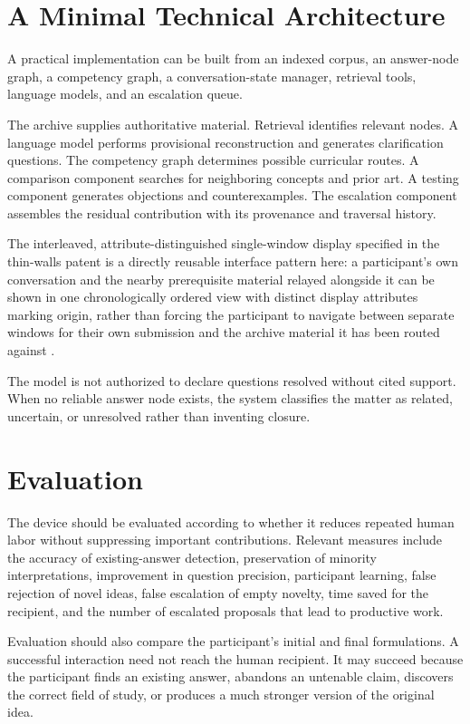 \documentclass[11pt]{article}
\begin{document}
\section{A Minimal Technical Architecture}

A practical implementation can be built from an indexed corpus, an answer-node graph, a competency graph, a conversation-state manager, retrieval tools, language models, and an escalation queue.

The archive supplies authoritative material. Retrieval identifies relevant nodes. A language model performs provisional reconstruction and generates clarification questions. The competency graph determines possible curricular routes. A comparison component searches for neighboring concepts and prior art. A testing component generates objections and counterexamples. The escalation component assembles the residual contribution with its provenance and traversal history.

The interleaved, attribute-distinguished single-window display specified in the thin-walls patent is a directly reusable interface pattern here: a participant's own conversation and the nearby prerequisite material relayed alongside it can be shown in one chronologically ordered view with distinct display attributes marking origin, rather than forcing the participant to navigate between separate windows for their own submission and the archive material it has been routed against \cite{anderson2011thinwalls}.

The model is not authorized to declare questions resolved without cited support. When no reliable answer node exists, the system classifies the matter as related, uncertain, or unresolved rather than inventing closure.

\section{Evaluation}

The device should be evaluated according to whether it reduces repeated human labor without suppressing important contributions. Relevant measures include the accuracy of existing-answer detection, preservation of minority interpretations, improvement in question precision, participant learning, false rejection of novel ideas, false escalation of empty novelty, time saved for the recipient, and the number of escalated proposals that lead to productive work.

Evaluation should also compare the participant's initial and final formulations. A successful interaction need not reach the human recipient. It may succeed because the participant finds an existing answer, abandons an untenable claim, discovers the correct field of study, or produces a much stronger version of the original idea.
\end{document}
